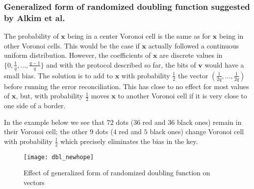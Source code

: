 \subsubsection{Generalized form of randomized doubling function suggested by Alkim et al.}
The probability of $\textbf{x}$ being in a center Voronoi cell is the same as for $\textbf{x}$ being in other Voronoi cells. This would be the case if $\textbf{x}$ actually followed a continuous uniform distribution. However, the coefficients of $\textbf{x}$ are discrete values in $\{0,\frac{1}{q},\dots,\frac{q-1}{q}\}$ and with the protocol described so far, the bits of $\textbf{v}$ would have a small bias. The solution is to add to $\textbf{x}$ with probability $\frac{1}{2}$ the vector $(\frac{1}{2q}, \dots, \frac{1}{2q})$ before running the error reconciliation. This has close to no effect for most values of $\textbf{x}$, but, with probability $\frac{1}{2}$ moves $\textbf{x}$ to another Voronoi cell if it is very close to one side of a border.

In the example below we see that $72$ dots ($36$ red and $36$ black ones) remain in their Voronoi cell; the other $9$ dots ($4$ red and $5$ black ones) change Voronoi cell with probability $\frac{1}{2}$ which precisely eliminates the bias in the key.

\begin{figure}[H]
\centering
\texttt{[image: dbl\_newhope]}
\caption{Effect of generalized form of randomized doubling function on vectors}
\end{figure}







